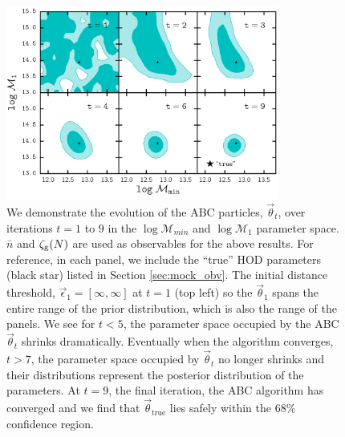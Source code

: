 \documentclass[fleqn,usenatbib]{mnras}
\newcommand{\pars}{\vec{\theta}}
\begin{document}
\begin{figure}
\includegraphics[width=0.8\textwidth]{figs/paper_ABC_poolevolution_nbargmf.pdf}
\caption{\label{fig:pool_demo} We demonstrate the evolution of the ABC particles, $\pars_t$, over iterations $t = 1$ to $9$ in the $\log \mathcal{M}_{min}$ and $\log \mathcal{M}_1$ parameter space. 
$\bar{n}$ and $\mathcal{\zeta}_{\rm g}(N)$ are used as observables for the above results. For reference, 
in each panel, we include the ``true'' HOD parameters (black star) listed in 
Section \ref{sec:mock_obv}. The initial distance threshold, $\vec\epsilon_1 = 
[\infty, \infty]$ at $t=1$ (top left) so the $\pars_1$ spans the entire range of the prior distribution, 
which is also the range of the panels. We see for $t < 5$, the parameter space occupied 
by the ABC $\pars_t$ shrinks dramatically. Eventually when the algorithm converges, 
$t > 7$, the parameter space occupied by $\pars_t$ no longer shrinks and their 
distributions represent the posterior distribution of the 
parameters. At $t=9$, the final iteration, the ABC algorithm has converged and 
we find that $\pars_\mathrm{true}$ lies safely within the $68\%$ confidence region.} 
\end{figure}

\end{document}
